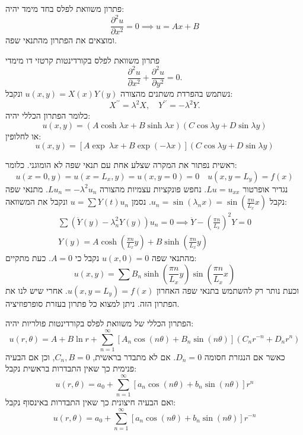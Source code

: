 \documentclass{tstextbook}
\begin{document}
\begin{proposition}
פתרון משוואת לפלס בחד מימד יהיה:
$$\frac{\partial^2 u}{\partial x^2} =0\implies u=Ax+B$$
ומוצאים את הפתרון מהתנאי שפה.

\end{proposition}
\begin{proposition}
פתרון משוואת לפלס בקורדינטות קרטזי דו מימדי
$$ \frac{\partial^2u}{\partial x^2}+\frac{\partial^2u}{\partial y^2}=0.$$
נשתמש בהפרדת משתנים מהצורה \(u(x,y)=X(x)Y(y)\) ונקבל:
$$ X^{\prime\prime}=\lambda^2X,\quad Y^{\prime\prime}=-\lambda^2Y.$$
כלומר הפתרון הכללי יהיה:
$$ u(x,y)=(A\cosh\lambda x+B\sinh\lambda x)(C\cos\lambda y+D\sin\lambda y)$$
או לחלופין:
$$ u(x,y)=[A\exp\:\lambda x+B\exp(-\lambda x)](C\cos\lambda y+D\sin\lambda y)$$

\end{proposition}
\begin{example}
ראשית נפתור את המקרה שצלע אחת עם תנאי שפה לא הומוגני. כלומר:
$$u(x=0,y)=u(x=L_{x},y)=u(x,y=0)=0\quad u(x,y=L_{y})=f(x)$$
נגדיר אופרטור \(Lu=u_{x x}\). נחפש פונקציות עצמיות מהצורה \(Lu_{n}=-\lambda^2u_{n}\). מתנאי שפה נקבל \(u_{n}=\sin \left( \lambda_{n} x \right)=\sin\left( \frac{\pi n}{L_{x}}x \right)\). נסמן \(u=\sum Y(t)u_{n}\) ונקבל את המשוואה:
\begin{gather*}\sum \left( \ddot{Y}(y) - \lambda_{n}^2Y(y) \right) u_{n} = 0\implies  \ddot{Y}- \left( \frac{\pi n}{L_{x}} \right)^2Y=0 \\Y(y)=A\cosh\left( \frac{\pi n}{L_{x}}y \right)+B\sinh\left( \frac{\pi n}{L_{x}}y \right)
\end{gather*}
מהתנאי שפה \(u(x,0)=0\) נקבל כי \(A=0\). כעת מתקיים:
$$u(x,y)=\sum B_{n}\sinh\left( \frac{\pi n}{L_{x}}y \right)\sin\left( \frac{\pi n}{L_{x}}x \right)$$
וכעת נותר רק להשתמש בתנאי שפה האחרון \(u(x,y=L_{y})=f(x)\).
אחרי שיש לנו את הפתרון הזה. ניתן למצוא כל פתרון בעזרת סופרפוזיציה.

\end{example}
\begin{proposition}
הפתרון הכללי של משוואת לפלס בקורדינטות פולריות יהיה:
$$\!\!\!u(r,\theta)\!=\!A\!+\!B\ln r\!+\!\sum_{n=1}^\infty\left[A_n\cos(n\theta)\!+\!B_n\sin(n\theta)\right](C_{n}r^{-n}\!+\!D_{n}r^n)$$
כאשר אם הנגזרת חסומה \(D_{n}=0\). אם לא מתבדר בראשית, \(C_{n},B=0\), וכן אם הבעיה פנימית כך שאין התבדרות בראשית נקבל:
$$ u(r,\theta)=a_0+\sum_{n=1}^{\infty}\left[a_n\cos(n\theta)+b_n\sin(n\theta)\right]r^{n}$$
ואם הבעיה חיצונית כך שאין התבדרות באינסוף נקבל:
$$ u(r,\theta)=a_0+\sum_{n=1}^{\infty}\left[a_n\cos(n\theta)+b_n\sin(n\theta)\right]r^{-n}$$

\end{proposition}
\end{document}
